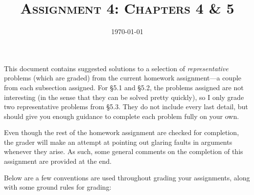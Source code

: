 \documentclass{amsart}
\title{\textsc{Assignment 4: Chapters 4 \& 5}}
\date{\today}
\theoremstyle{definition}
\theoremstyle{definition}
\DeclareMathOperator{\1}{\mathbbm{1}}
\begin{document}
	\sloppy
	\maketitle
	
	
	This document contains suggested solutions to a selection of \textit{representative} problems (which are graded) from the current homework assignment---a couple from each subsection assigned. For \S5.1 and \S5.2, the problems assigned are not interesting (in the sense that they can be solved pretty quickly), so I only grade two representative problems from \S5.3. They do not include every last detail, but should give you enough guidance to complete each problem fully on your own. 
	
	Even though the rest of the homework assignment are checked for completion, the grader will make an attempt at pointing out glaring faults in arguments whenever they arise. As such, some general comments on the completion of this assignment are provided at the end. 
	
	Below are a few conventions are used throughout grading your assignments, along with some ground rules for grading:
	
\end{document}
